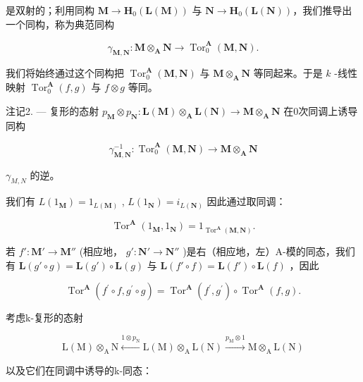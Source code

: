 是双射的；利用同构 \(\mathbf{M} \to \mathbf{H}_{0}(\mathbf{L}(\mathbf{M}))\) 与 \(\mathbf{N} \to \mathbf{H}_{0}(\mathbf{L}(\mathbf{N}))\)，我们推导出一个同构，称为典范同构

\[
\gamma_ {\mathbf {M}, \mathbf {N}}: \mathbf {M} \otimes_ {\mathbf {A}} \mathbf {N} \rightarrow \operatorname{Tor} _ {0} ^ {\mathbf {A}} (\mathbf {M}, \mathbf {N}).\tag{7}
\]

我们将始终通过这个同构把 \(\operatorname{Tor}_{0}^{\mathbf{A}}(\mathbf{M},\mathbf{N})\) 与 \(\mathbf{M}\otimes_{\mathbf{A}}\mathbf{N}\) 等同起来。于是 \(k\) -线性映射 \(\operatorname{Tor}_{0}^{\mathbf{A}}(f,g)\) 与 \(f\otimes g\) 等同。

注记2. --- 复形的态射 \(p_{\mathbf{M}} \otimes p_{\mathbf{N}}: \mathbf{L}(\mathbf{M}) \otimes_{\mathbf{A}} \mathbf{L}(\mathbf{N}) \to \mathbf{M} \otimes_{\mathbf{A}} \mathbf{N}\) 在0次同调上诱导同构

\[
\gamma_ {\mathbf {M}, \mathbf {N}} ^ {- 1}: \operatorname{Tor} _ {0} ^ {\mathbf {A}} (\mathbf {M}, \mathbf {N}) \rightarrow \mathbf {M} \otimes_ {\mathbf {A}} \mathbf {N}
\]

\(\gamma_{M,N}\) 的逆。

我们有 \(L(1_{\mathbf{M}}) = 1_{L(\mathbf{M})}\) , \(L(1_{\mathbf{N}}) = i_{L(\mathbf{N})}\) 因此通过取同调：

\[
\operatorname{Tor} ^ {\mathbf {A}} \left(1 _ {\mathbf {M}}, 1 _ {\mathbf {N}}\right) = 1 _ {\operatorname{Tor} ^ {\mathbf {A}} (\mathbf {M}, \mathbf {N})}.\tag{8}
\]

若 \(f': \mathbf{M}' \to \mathbf{M}''\) (相应地， \(g': \mathbf{N}' \to \mathbf{N}''\) )是右（相应地，左）A-模的同态，我们有 \(\mathbf{L}(g' \circ g) = \mathbf{L}(g') \circ \mathbf{L}(g)\) 与 \(\mathbf{L}(f' \circ f) = \mathbf{L}(f') \circ \mathbf{L}(f)\) ，因此

\[
\operatorname{Tor} ^ {\mathbf {A}} \left(f ^ {\prime} \circ f, g ^ {\prime} \circ g\right) = \operatorname{Tor} ^ {\mathbf {A}} \left(f ^ {\prime}, g ^ {\prime}\right) \circ \operatorname{Tor} ^ {\mathbf {A}} (f, g).\tag{9}
\]

考虑k-复形的态射

\[
\mathrm{L} (\mathrm{M}) \otimes_ {\mathrm{A}} \mathrm{N} \xleftarrow {1 \otimes p _ {\mathrm{N}}} \mathrm{L} (\mathrm{M}) \otimes_ {\mathrm{A}} \mathrm{L} (\mathrm{N}) \xrightarrow {p _ {\mathrm{M}} \otimes 1} \mathrm{M} \otimes_ {\mathrm{A}} \mathrm{L} (\mathrm{N})
\]

以及它们在同调中诱导的k-同态：

